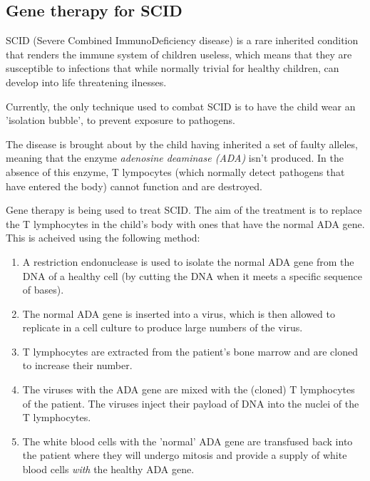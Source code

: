 \documentclass{article}
\begin{document}
\subsection*{Gene therapy for SCID}

SCID (Severe Combined ImmunoDeficiency disease) is a rare inherited condition
that renders the immune system of children useless, which means that they are
susceptible to infections that while normally trivial for healthy children, can
develop into life threatening ilnesses.

Currently, the only technique used to combat SCID is to have the child wear an
'isolation bubble', to prevent exposure to pathogens.

The disease is brought about by the child having inherited a set of faulty
alleles, meaning that the enzyme {\it adenosine deaminase (ADA)} isn't produced.
In the absence of this enzyme, T lympocytes (which normally detect pathogens
that have entered the body) cannot function and are destroyed.

Gene therapy is being used to treat SCID. The aim of the treatment is to replace
the T lymphocytes in the child's body with ones that have the normal ADA gene.
This is acheived using the following method:

\begin{enumerate}

	\item A restriction endonuclease is used to isolate the normal ADA gene from
	the DNA of a healthy cell (by cutting the DNA when it meets a specific
	sequence of bases).

	\item The normal ADA gene is inserted into a virus, which is then allowed to
	replicate in a cell culture to produce large numbers of the virus.

	\item T lymphocytes are extracted from the patient's bone marrow and are
	cloned to increase their number.

	\item The viruses with the ADA gene are mixed with the (cloned) T
	lymphocytes of the patient. The viruses inject their payload of DNA into
	the nuclei of the T lymphocytes.

	\item The white blood cells with the 'normal' ADA gene are transfused back
	into the patient where they will undergo mitosis and provide a supply of
	white blood cells {\it with} the healthy ADA gene.

\end{enumerate}

\end{document}
